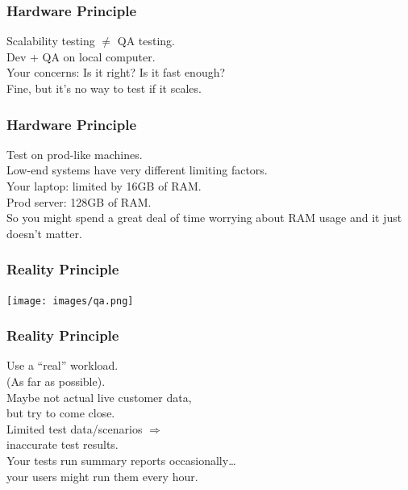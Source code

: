\begin{frame}
\frametitle{Hardware Principle}


\begin{changemargin}{2cm}
Scalability testing $\neq$  QA testing.\\[1em]

Dev + QA on local computer.\\
Your concerns: Is it right? Is it fast enough?\\[1em]

Fine, but it's no way to test if it scales. 
\end{changemargin}

\end{frame}



\begin{frame}
\frametitle{Hardware Principle}


\begin{changemargin}{2cm}
Test on prod-like machines.\\[1em]
Low-end systems have very different limiting factors. \\[1em]
Your laptop: limited by 16GB of RAM.\\
Prod server: 128GB of RAM.\\[1em]
So you might spend a great deal of time worrying about RAM usage and it just doesn't matter.
\end{changemargin}

\end{frame}



\begin{frame}
\frametitle{Reality Principle}

\begin{center}
	\texttt{[image: images/qa.png]}
\end{center}


\end{frame}


\begin{frame}
\frametitle{Reality Principle}

\begin{changemargin}{2cm}
Use a ``real'' workload.\\
(As far as possible).\\[1em]
Maybe not actual live customer data,\\
but try to come close.\\[1em]
Limited test data/scenarios $\Rightarrow$ \\
\qquad inaccurate test results.\\[1em]
Your tests run summary reports occasionally\ldots\\
your users might run them every hour. 
\end{changemargin}
\end{frame}




